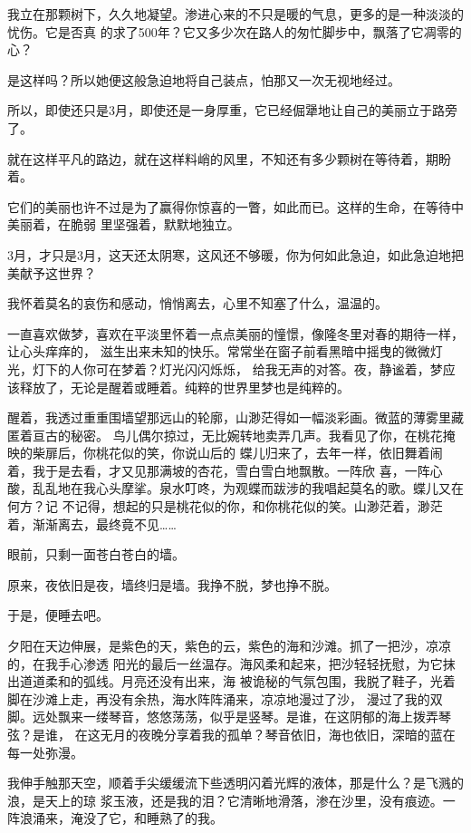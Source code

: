 		我立在那颗树下，久久地凝望。渗进心来的不只是暖的气息，更多的是一种淡淡的忧伤。它是否真
	的求了500年？它又多少次在路人的匆忙脚步中，飘落了它凋零的心？

		是这样吗？所以她便这般急迫地将自己装点，怕那又一次无视地经过。

		所以，即使还只是3月，即使还是一身厚重，它已经倔犟地让自己的美丽立于路旁了。

		就在这样平凡的路边，就在这样料峭的风里，不知还有多少颗树在等待着，期盼着。

		它们的美丽也许不过是为了赢得你惊喜的一瞥，如此而已。这样的生命，在等待中美丽着，在脆弱
	里坚强着，默默地独立。

		3月，才只是3月，这天还太阴寒，这风还不够暖，你为何如此急迫，如此急迫地把美献予这世界？

		我怀着莫名的哀伤和感动，悄悄离去，心里不知塞了什么，温温的。

	\endwriting



		一直喜欢做梦，喜欢在平淡里怀着一点点美丽的憧憬，像隆冬里对春的期待一样，让心头痒痒的，
	滋生出来未知的快乐。常常坐在窗子前看黑暗中摇曳的微微灯光，灯下的人你可在梦着？灯光闪闪烁烁，
	给我无声的对答。夜，静谧着，梦应该释放了，无论是醒着或睡着。纯粹的世界里梦也是纯粹的。

		醒着，我透过重重围墙望那远山的轮廓，山渺茫得如一幅淡彩画。微蓝的薄雾里藏匿着亘古的秘密。
	鸟儿偶尔掠过，无比婉转地卖弄几声。我看见了你，在桃花掩映的柴扉后，你桃花似的笑，你说山后的
	蝶儿归来了，去年一样，依旧舞着闹着，我于是去看，才又见那满坡的杏花，雪白雪白地飘散。一阵欣
	喜，一阵心酸，乱乱地在我心头摩挲。泉水叮咚，为观蝶而跋涉的我唱起莫名的歌。蝶儿又在何方？记
	不记得，想起的只是桃花似的你，和你桃花似的笑。山渺茫着，渺茫着，渐渐离去，最终竟不见……

		眼前，只剩一面苍白苍白的墙。

		原来，夜依旧是夜，墙终归是墙。我挣不脱，梦也挣不脱。

		于是，便睡去吧。

		夕阳在天边伸展，是紫色的天，紫色的云，紫色的海和沙滩。抓了一把沙，凉凉的，在我手心渗透
	阳光的最后一丝温存。海风柔和起来，把沙轻轻抚慰，为它抹出道道柔和的弧线。月亮还没有出来，海
	被诡秘的气氛包围，我脱了鞋子，光着脚在沙滩上走，再没有余热，海水阵阵涌来，凉凉地漫过了沙，
	漫过了我的双脚。远处飘来一缕琴音，悠悠荡荡，似乎是竖琴。是谁，在这阴郁的海上拨弄琴弦？是谁，
	在这无月的夜晚分享着我的孤单？琴音依旧，海也依旧，深暗的蓝在每一处弥漫。

		我伸手触那天空，顺着手尖缓缓流下些透明闪着光辉的液体，那是什么？是飞溅的浪，是天上的琼
	浆玉液，还是我的泪？它清晰地滑落，渗在沙里，没有痕迹。一阵浪涌来，淹没了它，和睡熟了的我。

